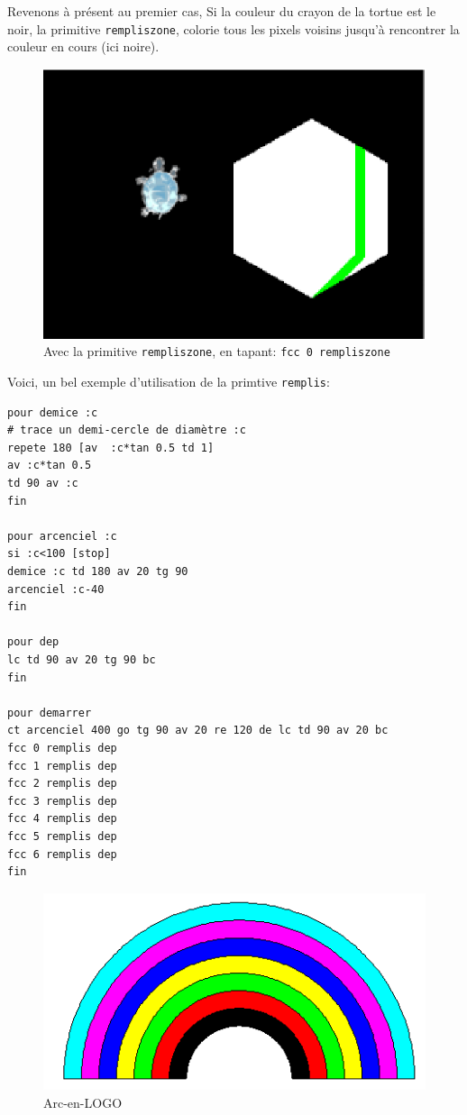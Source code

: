 \noindent Revenons à présent au premier cas, Si la couleur du crayon de la tortue est le noir, la primitive \texttt{rempliszone}, colorie tous les pixels voisins jusqu'à rencontrer la couleur en cours (ici noire).
\begin{figure}[h]
\begin{center}
\includegraphics*[scale=0.2]{images/remplis2.png}
\caption {Avec la primitive \texttt{rempliszone}, en tapant: \texttt{fcc 0 rempliszone} }
\end{center}
\end{figure}
\noindent Voici, un bel exemple d'utilisation de la primtive \texttt{remplis}:
\begin{verbatim}
pour demice :c
# trace un demi-cercle de diamètre :c
repete 180 [av  :c*tan 0.5 td 1]
av :c*tan 0.5
td 90 av :c
fin

pour arcenciel :c
si :c<100 [stop]
demice :c td 180 av 20 tg 90
arcenciel :c-40
fin

pour dep
lc td 90 av 20 tg 90 bc
fin

pour demarrer
ct arcenciel 400 go tg 90 av 20 re 120 de lc td 90 av 20 bc
fcc 0 remplis dep 
fcc 1 remplis dep
fcc 2 remplis dep
fcc 3 remplis dep
fcc 4 remplis dep
fcc 5 remplis dep
fcc 6 remplis dep
fin
\end{verbatim} 
\pagebreak
\begin{figure}
\includegraphics*{images/arc.png}
\caption{Arc-en-LOGO}
\end{figure} 
